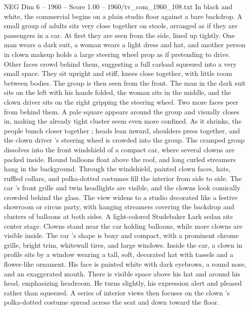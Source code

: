 \begin{textsample}{NEG Dim 6 – 1960 – Score 1.00 – 1960/tv\_com\_1960\_108.txt}  \label{ex:f6_neg_078}
In black and white, the commercial begins on a plain studio floor against a bare backdrop.
A small group of adults sits very close together on stools, arranged as if they are passengers in a car.
At first they are seen from the side, lined up tightly.
One man wears a dark suit, a woman wears a light dress and hat, and another person in clown makeup holds a large steering wheel prop as if pretending to drive.
Other faces crowd behind them, suggesting a full carload squeezed into a very small space.
They sit upright and stiff, knees close together, with little room between bodies.
The group is then seen from the front.
The man in the dark suit sits on the left with his hands folded, the woman sits in the middle, and the clown driver sits on the right gripping the steering wheel.
Two more faces peer from behind them.
A pale square appears around the group and visually closes in, making the already tight cluster seem even more confined.
As it shrinks, the people bunch closer together ; heads lean inward, shoulders press together, and the clown driver ’s steering wheel is crowded into the group.
The cramped group dissolves into the front windshield of a compact car, where several clowns are packed inside.
Round balloons float above the roof, and long curled streamers hang in the background.
Through the windshield, painted clown faces, hats, ruffled collars, and polka-dotted costumes fill the interior from side to side.
The car ’s front grille and twin headlights are visible, and the clowns look comically crowded behind the glass.
The view widens to a studio decorated like a festive showroom or circus party, with hanging streamers covering the backdrop and clusters of balloons at both sides.
A light-colored Studebaker Lark sedan sits center stage.
Clowns stand near the car holding balloons, while more clowns are visible inside.
The car ’s shape is boxy and compact, with a prominent chrome grille, bright trim, whitewall tires, and large windows.
Inside the car, a clown in profile sits by a window wearing a tall, soft, decorated hat with tassels and a flower-like ornament.
His face is painted white with dark eyebrows, a round nose, and an exaggerated mouth.
There is visible space above his hat and around his head, emphasizing headroom.
He turns slightly, his expression alert and pleased rather than squeezed.
A series of interior views then focuses on the clown ’s polka-dotted costume spread across the seat and down toward the floor.

\end{textsample}
